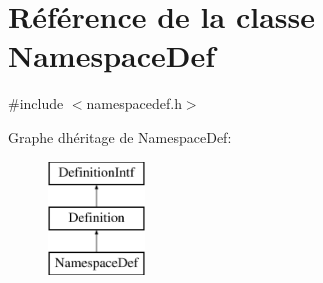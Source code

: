 \hypertarget{class_namespace_def}{}\section{Référence de la classe Namespace\+Def}
\label{class_namespace_def}


{\ttfamily \#include $<$namespacedef.\+h$>$}

Graphe d\textquotesingle{}héritage de Namespace\+Def\+:\begin{figure}[H]
\begin{center}
\leavevmode
\includegraphics[height=3.000000cm]{class_namespace_def}
\end{center}
\end{figure}
